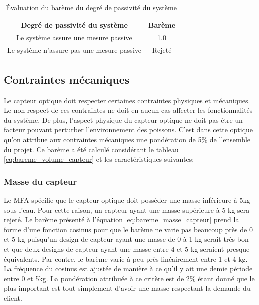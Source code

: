\begin{table}[htp]
   \footnotesize
   \centering
   \begin{tabular}{|c|c|}
        \hline
        Degré de passivité du système & Barème\\
        \hline
        \hline
        Le système assure une mesure passive & 1.0 \\
        \hline
        Le système n'assure pas une mesure passive & Rejeté \\
        \hline
   \end{tabular}
   \caption{Évaluation du barème du degré de passivité du système}
   \label{t:bareme_systeme_passif}
\end{table}

\subsection{Contraintes mécaniques}

Le capteur optique doit respecter certaines contraintes physiques et mécaniques. Le non respect de ces contraintes ne doit en aucun cas affecter les fonctionnalités du système. De plus, l'aspect physique du capteur optique ne doit pas être un facteur pouvant perturber l'environnement des poissons. C'est dans cette optique qu'on attribue aux contraintes mécaniques une pondération de 5\% de l'ensemble du projet. Ce barème a été calculé considérant le tableau \ref{eq:bareme_volume_capteur} et les caractéristiques suivantes:

\subsubsection{Masse du capteur}

Le MFA spécifie que le capteur optique doit posséder une masse inférieure à 5kg sous l'eau. Pour cette raison, un capteur ayant une masse supérieure à 5 kg sera rejeté. Le barème présenté à l'équation \ref{eq:bareme_masse_capteur} prend la forme d'une fonction cosinus pour que le barème ne varie pas beaucoup près de 0 et 5 kg puisqu'un design de capteur ayant une masse de 0 à 1 kg serait très bon et que deux designs de capteur ayant une masse entre 4 et 5 kg seraient presque équivalents. Par contre, le barème varie à peu près linéairement entre 1 et 4 kg. La fréquence du cosinus est ajustée de manière à ce qu'il y ait une demie période entre 0 et 5kg. La pondération attribuée à ce critère est de 2$\%$ étant donné que le plus important est tout simplement d'avoir une masse respectant la demande du client.

